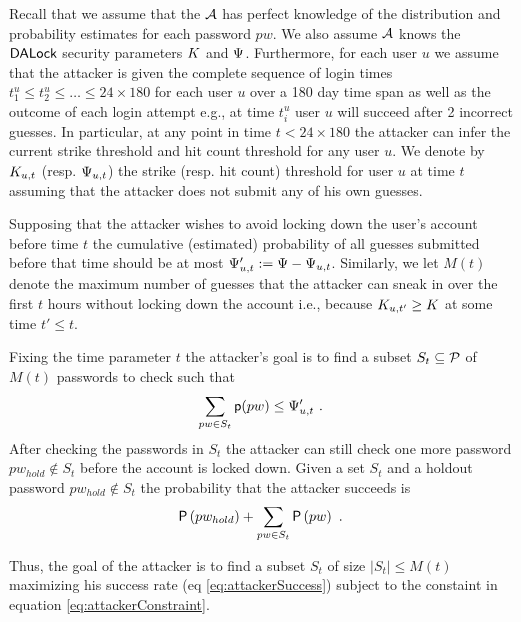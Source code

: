Recall that we assume that the $\mathcal{A}$ has perfect knowledge of the distribution and probability estimates for each password $pw$. We also assume $\mathcal{A}$ knows the $\mathsf{DALock}$ security parameters $K$ and $\Psi$. Furthermore, for each user $u$ we assume that the attacker is given the complete sequence of login times $t_1^u \leq t_2^u \leq  \ldots \leq 24 \times 180$ for each user $u$ over a 180 day time span as well as the outcome of each login attempt e.g., at time $t_i^u$ user $u$ will succeed after 2 incorrect guesses. In particular, at any point in time $t < 24\times 180$ the attacker can infer the current strike threshold and hit count threshold for any user $u$. We denote by $K_{u,t}$ (resp. $\Psi_{u,t}$) the strike (resp. hit count) threshold  for user $u$ at time $t$ assuming that the attacker does not submit any of his own guesses. 

Supposing that the attacker wishes to avoid locking down the user's account before time $t$ the cumulative (estimated) probability of all guesses submitted before that time should be at most $\Psi_{u,t}':=\Psi- \Psi_{u,t}$. Similarly, we let $M(t)$ denote the maximum number of guesses that the attacker can sneak in over the first $t$ hours without locking down the account i.e., because $K_{u,t'}  \geq K$ at some time $t' \leq t$. 

Fixing the time parameter $t$ the attacker’s goal is to find a subset $S_t \subseteq \mathcal{P}$ of $M(t)$ passwords to check such that 
\begin{equation} \label{eq:attackerConstraint}
	\vspace{-0.2cm} 
	\sum_{pw \in S_t} \EstP{pw} \leq \hitCountThresholdOfU{u,t}' \ . \vspace{-0.1cm} 
\end{equation}
After checking the passwords in $S_t$ the attacker can still check one more password $pw_{hold} \not\in S_t$ before the account is locked down. Given a set $S_t$ and a holdout password $pw_{hold} \not\in S_t$ the probability that the attacker succeeds is 
\begin{equation}\vspace{-0.2cm} \label{eq:attackerSuccess} \TrueP{pw_{hold}} + \sum_{pw \in S_t}\TrueP{pw} \ . \vspace{-0.1cm} \end{equation}

Thus, the goal of the attacker is to find a subset $S_t$ of size $|S_t| \leq M(t)$ maximizing his success rate (eq \ref{eq:attackerSuccess}) subject to the constaint in  equation \ref{eq:attackerConstraint}.

